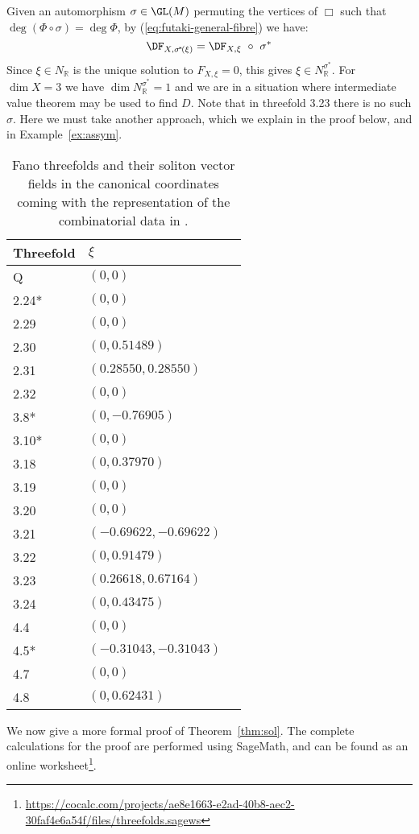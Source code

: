 Given an automorphism \(\sigma \in \GL(M)\) permuting the vertices of \(\Box\) such that \(\deg (\Phi \circ \sigma) = \deg \Phi\), by (\ref{eq:futaki-general-fibre}) we have:
\[
\DF_{X, \sigma^{\!*}\!(\xi)}  =  \DF_{X, \xi} \ \circ \ \sigma^*
\]
Since \(\xi \in N_\mathbb{R}\) is the unique solution to \(F_{X,\xi} = 0\), this gives \(\xi \in N_{\mathbb{R}}^{\sigma^*}\). For \(\dim X = 3\) we have \(\dim N_{\mathbb{R}}^{\sigma^*}  = 1\) and we are in a situation where intermediate value theorem may be used to find \(D\). Note that in threefold 3.23 there is no such \(\sigma\). Here we must take another approach, which we explain in the proof below, and in Example~\ref{ex:assym}.
%
%
%
\begin{table}[H]  \centering
\captionsetup{width=.95\linewidth}
\caption{Fano threefolds and their soliton vector fields in the canonical coordinates coming with the representation of the combinatorial data in \cite{suss2013fano}.}  \label{table:solitontable}
\begin{tabular}{l l l}
\toprule
Threefold & $\xi$ & \\ \hline
Q & $(0,0)$ \\
2.24* & $(0,0)$ \\
2.29 & $(0,0)$ \\
2.30 & $(0,0.51489)$ \\
2.31 & $(0.28550,0.28550)$\\
2.32 & $(0,0)$ \\
3.8* & $(0,-0.76905)$ \\
3.10* & $(0,0)$ \\
3.18 & $(0,0.37970)$ \\
3.19 & $(0,0)$ \\
3.20 & $(0,0)$ \\
3.21 & $(-0.69622,-0.69622)$ \\
3.22 & $(0,0.91479)$ \\
3.23 & $(0.26618,  0.67164)$ \\
3.24 & $(0,0.43475)$ \\
4.4 &  $(0,0)$ \\
4.5* &  $(-0.31043,-0.31043)$ \\
4.7 &  $(0,0)$ \\
4.8 &  $(0,0.62431)$ \\
\bottomrule
\end{tabular}
\label{table:name}
\end{table}
We now give a more formal proof of Theorem~\ref{thm:sol}. The complete calculations for the proof are performed using SageMath, and can be found as an online worksheet\footnote{\url{https://cocalc.com/projects/ae8e1663-e2ad-40b8-aec2-30faf4e6a54f/files/threefolds.sagews}}.
